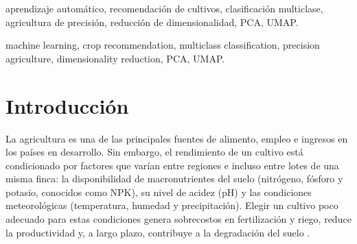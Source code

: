 \documentclass[conference]{IEEEtran}
\begin{document}
\renewcommand{\IEEEkeywordsname}{Palabras clave}
\begin{IEEEkeywords}
aprendizaje automático, recomendación de cultivos, clasificación multiclase, agricultura de precisión, reducción de dimensionalidad, PCA, UMAP.
\end{IEEEkeywords}

\begin{abstract}
Selecting the appropriate crop for a plot of land depends on the interaction between the physicochemical properties of the soil and the climatic conditions of the area. When this decision relies solely on experience or general criteria, it can lead to inaccurate recommendations, wasted resources, and low yields. This work proposes a machine learning-based predictive system that recommends the most suitable crop from seven variables: nitrogen, phosphorus, potassium, temperature, relative humidity, pH, and rainfall. A public dataset of 2200 records, evenly distributed across 22 crops and free of missing values and duplicates, is used. The problem is formulated as a supervised multiclass classification task. Exploratory analysis indicates that potassium, humidity, and phosphorus have the greatest class-separation capacity, and that phosphorus and potassium are strongly correlated ($r=0.74$), suggesting redundancy in the feature space. Classifiers from different families (logistic regression, $k$-nearest neighbors, Random Forest, artificial neural networks, and support vector machines) will be compared using stratified cross-validation, with accuracy and macro F1 as the main metrics. In addition, the effect of feature selection and dimensionality reduction through PCA and UMAP on predictive performance will be studied.
\end{abstract}

\renewcommand{\IEEEkeywordsname}{Index Terms}
\begin{IEEEkeywords}
machine learning, crop recommendation, multiclass classification, precision agriculture, dimensionality reduction, PCA, UMAP.
\end{IEEEkeywords}


\section{Introducción}

La agricultura es una de las principales fuentes de alimento, empleo e ingresos en los países en desarrollo. Sin embargo, el rendimiento de un cultivo está condicionado por factores que varían entre regiones e incluso entre lotes de una misma finca: la disponibilidad de macronutrientes del suelo (nitrógeno, fósforo y potasio, conocidos como NPK), su nivel de acidez (pH) y las condiciones meteorológicas (temperatura, humedad y precipitación). Elegir un cultivo poco adecuado para estas condiciones genera sobrecostos en fertilización y riego, reduce la productividad y, a largo plazo, contribuye a la degradación del suelo \cite{thilakarathne2022}.
\end{document}
